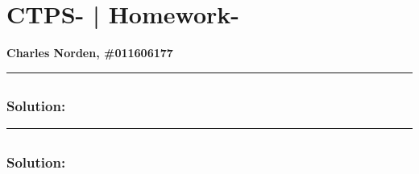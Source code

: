 \documentclass[12pt,letterpaper]{article}
\begin{document}
\section*{ CTPS- | Homework- }
\large\textbf*{ Charles Norden, \#011606177 }

\hrule
\subsection*{}
\subsubsection*{Solution:}
\pagebreak

\hrule
\subsection*{}
\subsubsection*{Solution:}
\pagebreak
\end{document}
